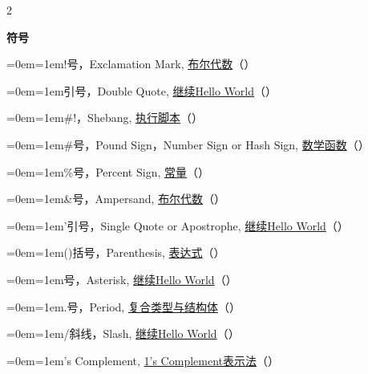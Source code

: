 

%
\begin{multicols}{2}
\raggedright
\par\medskip\noindent\textbf{符号}\par\nopagebreak
{\leftskip=0em\relax \hangindent=1em\noindent !号，Exclamation Mark, \hyperlink{db.ch04s03}{布尔代数}（\pageref{db.ch04s03}）\par}
{\leftskip=0em\relax \hangindent=1em\noindent \BookQuoteChar{}引号，Double Quote, \hyperlink{db.ch02s01}{继续Hello World}（\pageref{db.ch02s01}）\par}
{\leftskip=0em\relax \hangindent=1em\noindent \#!，Shebang, \hyperlink{db.ch31s02.id2872211}{执行脚本}（\pageref{db.ch31s02.id2872211}）\par}
{\leftskip=0em\relax \hangindent=1em\noindent \#号，Pound Sign，Number Sign or Hash Sign, \hyperlink{db.ch03s01}{数学函数}（\pageref{db.ch03s01}）\par}
{\leftskip=0em\relax \hangindent=1em\noindent \%号，Percent Sign, \hyperlink{db.ch02s02}{常量}（\pageref{db.ch02s02}）\par}
{\leftskip=0em\relax \hangindent=1em\noindent \&号，Ampersand, \hyperlink{db.ch04s03}{布尔代数}（\pageref{db.ch04s03}）\par}
{\leftskip=0em\relax \hangindent=1em\noindent '引号，Single Quote or Apostrophe, \hyperlink{db.ch02s01}{继续Hello World}（\pageref{db.ch02s01}）\par}
{\leftskip=0em\relax \hangindent=1em\noindent ()括号，Parenthesis, \hyperlink{db.expr.expression}{表达式}（\pageref{db.expr.expression}）\par}
{\leftskip=0em\relax \hangindent=1em\noindent *号，Asterisk, \hyperlink{db.ch02s01}{继续Hello World}（\pageref{db.ch02s01}）\par}
{\leftskip=0em\relax \hangindent=1em\noindent .号，Period, \hyperlink{db.ch07s01}{复合类型与结构体}（\pageref{db.ch07s01}）\par}
{\leftskip=0em\relax \hangindent=1em\noindent /斜线，Slash, \hyperlink{db.ch02s01}{继续Hello World}（\pageref{db.ch02s01}）\par}
{\leftskip=0em\relax \hangindent=1em's Complement, \hyperlink{db.ch14s03.id2753761}{1's Complement表示法}（\pageref{db.ch14s03.id2753761}）\par}

\end{multicols}
